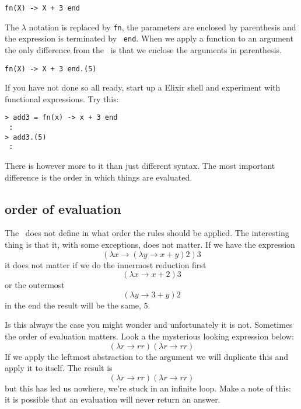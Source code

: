 \documentclass[a4paper,11pt]{article}
\begin{document}
\vspace{10pt}
\begin{center}{\tt fn(X) ->  X  + 3 end}
\end{center}
\vspace{10pt}

The $\lambda$ notation is replaced by {\tt fn}, the parameters are
enclosed by parenthesis and the expression is terminated by {\tt
  end}. When we apply a function to an argument the only difference
from the \lamc\ is that we enclose the arguments in parenthesis.

\vspace{10pt}
\begin{center}{\tt fn(X) ->  X  + 3 end.(5)}
\end{center}
\vspace{10pt}

If you have not done so all ready, start up a Elixir shell and
experiment with functional expressions. Try this:

\begin{verbatim}
> add3 = fn(x) -> x + 3 end
 :
> add3.(5)
 :
\end{verbatim}

There is however more to it than just different syntax. The most
important difference is the order in which things are evaluated.


\subsection{order of evaluation}

The \lamc\ does not define in what order the rules should be applied. The
interesting thing is that it, with some exceptions, does not matter. If we
have the expression
$$(\lambda x \rightarrow (\lambda y \rightarrow x + y) 2) 3$$ 
it does not matter if we do the innermost reduction first
$$(\lambda x \rightarrow x + 2) 3$$ 
or the outermost 
$$ (\lambda y \rightarrow 3 + y) 2$$ 
in the end the result will be the same, $5$.

Is this always the case you might wonder and unfortunately it is not.
Sometimes the order of evaluation matters. Look a the mysterious
looking expression below:
$$(\lambda r \rightarrow r r)(\lambda r \rightarrow r r)$$ 
If we apply the leftmost abstraction to the argument we will duplicate
this and apply it to itself. The result is
$$(\lambda r \rightarrow r r)(\lambda r \rightarrow r r)$$ 
but this has led us nowhere, we're stuck in an infinite loop. Make a
note of this: it is possible that an evaluation will never return an answer.
\end{document}
